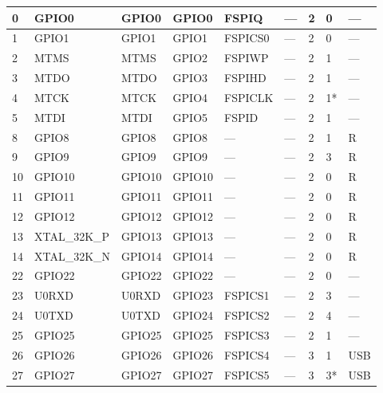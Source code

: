\begin{longtable}[c]{|p{0.7cm}|p{1.9cm}|p{1.9cm}|p{1.9cm}|p{1.9cm}|p{1.9cm}|p{1cm}|p{1cm}|p{1.2cm}| }
0 & GPIO0            & GPIO0         & GPIO0   & FSPIQ        & ---            & 2           & 0 & --- \\ \hline
1 & GPIO1            & GPIO1         & GPIO1   & FSPICS0      & ---            & 2           & 0 & --- \\ \hline
2 & MTMS             & MTMS          & GPIO2   & FSPIWP       & ---            & 2           & 1 & --- \\ \hline
3 & MTDO             & MTDO          & GPIO3   & FSPIHD       & ---            & 2           & 1 & --- \\ \hline
4 & MTCK             & MTCK          & GPIO4   & FSPICLK      & ---            & 2           & 1* & --- \\ \hline
5 & MTDI             & MTDI          & GPIO5   & FSPID        & ---            & 2           & 1 & --- \\ \hline
8 & GPIO8            & GPIO8         & GPIO8   & ---          & ---            & 2           & 1 & R \\ \hline
9 & GPIO9            & GPIO9         & GPIO9   & ---          & ---            & 2           & 3 & R \\ \hline
10 & GPIO10          & GPIO10        & GPIO10  & ---          & ---            & 2           & 0 & R \\ \hline
11 & GPIO11          & GPIO11        & GPIO11  & ---          & ---            & 2           & 0 & R \\ \hline
12 & GPIO12          & GPIO12        & GPIO12  & ---          & ---            & 2           & 0 & R \\ \hline
13 & XTAL\_32K\_P    & GPIO13        & GPIO13  & ---          & ---            & 2           & 0 & R \\ \hline
14 & XTAL\_32K\_N    & GPIO14        & GPIO14  & ---          & ---            & 2           & 0 & R \\ \hline
22 & GPIO22          & GPIO22        & GPIO22  & ---          & ---            & 2           & 0 & --- \\ \hline
23 & U0RXD           & U0RXD         & GPIO23  & FSPICS1      & ---            & 2           & 3 & --- \\ \hline
24 & U0TXD           & U0TXD         & GPIO24  & FSPICS2      & ---            & 2           & 4 & --- \\ \hline
25 & GPIO25          & GPIO25        & GPIO25  & FSPICS3      & ---            & 2           & 1 & --- \\ \hline
26 & GPIO26          & GPIO26        & GPIO26  & FSPICS4      & ---            & 3           & 1 & USB \\ \hline
27 & GPIO27          & GPIO27        & GPIO27  & FSPICS5      & ---            & 3           & 3* & USB \\ \hline


    \end{longtable}
\normalsize

